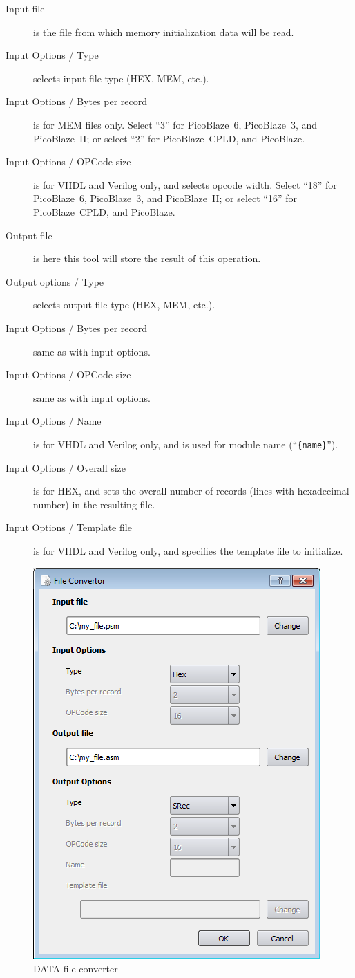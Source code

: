         \begin{description}
            \item[Input file] is the file from which memory initialization data will be read.
            \item[Input Options / Type] selects input file type (HEX, MEM, etc.).
            \item[Input Options / Bytes per record] is for MEM files only. Select ``3'' for PicoBlaze~6, PicoBlaze~3, and PicoBlaze~II; or select ``2'' for PicoBlaze~CPLD, and PicoBlaze.
            \item[Input Options / OPCode size] is for VHDL and Verilog only, and selects opcode width. Select ``18'' for PicoBlaze~6, PicoBlaze~3, and PicoBlaze~II; or select ``16'' for PicoBlaze~CPLD, and PicoBlaze.
            \item[Output file] is here this tool will store the result of this operation.
            \item[Output options / Type]  selects output file type (HEX, MEM, etc.).
            \item[Input Options / Bytes per record] same as with input options.
            \item[Input Options / OPCode size] same as with input options.
            \item[Input Options / Name] is for VHDL and Verilog only, and is used for module name (``\verb'{name}''').
            \item[Input Options / Overall size] is for HEX, and sets the overall number of records (lines with hexadecimal number) in the resulting file.
            \item[Input Options / Template file]  is for VHDL and Verilog only, and specifies the template file to initialize.
        \end{description}

        \enlargethispage{6\baselineskip}
        \begin{figure}[h]
            \centering
            \includegraphics[width=.4\textwidth]{img/DATA_converter.png}
            \caption{DATA file converter}
        \end{figure}

